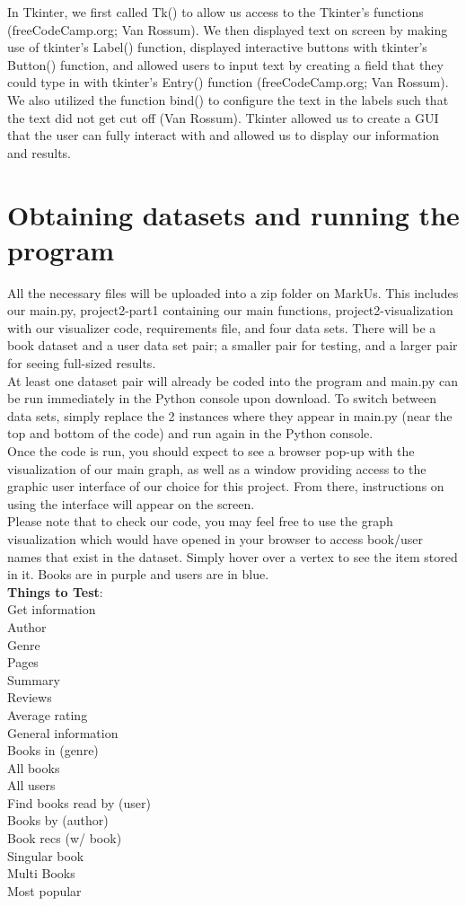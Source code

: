 \documentclass{article}
\begin{document}
In Tkinter, we first called Tk() to allow us access to the Tkinter's functions (freeCodeCamp.org; Van Rossum). We then displayed text on screen by making use of tkinter's Label() function, displayed interactive buttons with tkinter's Button() function, and allowed users to input text by creating a field that they could type in with tkinter's Entry() function (freeCodeCamp.org; Van Rossum). We also utilized the function bind() to configure the text in the labels such that the text did not get cut off  (Van Rossum). Tkinter allowed us to create a GUI that the user can fully interact with and allowed us to display our information and results.
\section{Obtaining datasets and running the program}
All the necessary files will be uploaded into a zip folder on MarkUs. This includes our main.py, project2-part1 containing our main functions, project2-visualization with our visualizer code, requirements file, and four data sets. There will be a book dataset and a user data set pair; a smaller pair for testing, and a larger pair for seeing full-sized results.\\
\indent At least one dataset pair will already be coded into the program and main.py can be run immediately in the Python console upon download. To switch between data sets, simply replace the 2 instances where they appear in main.py (near the top and bottom of the code) and run again in the Python console.\\
\indent Once the code is run, you should expect to see a browser pop-up with the visualization of our main graph, as well as a window providing access to the graphic user interface of our choice for this project. From there, instructions on using the interface will appear on the screen.\\
\indent Please note that to check our code, you may feel free to use the graph visualization which would have opened in your browser to access book/user names that exist in the dataset. Simply hover over a vertex to see the item stored in it. Books are in purple and users are in blue.\\

\textbf{Things to Test}:\\
Get information\\
\indent Author\\
\indent Genre\\
\indent Pages\\
\indent Summary\\
\indent Reviews\\
\indent Average rating\\
\indent General information\\
Books in (genre)\\
All books\\
All users\\
Find books read by (user)\\
Books by (author)\\
Book recs (w/ book)\\
\indent Singular book\\
\indent Multi Books\\
Most popular
\end{document}
